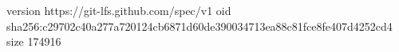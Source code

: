 version https://git-lfs.github.com/spec/v1
oid sha256:c29702c40a277a720124cb6871d60de390034713ea88c81fce8fe407d4252cd4
size 174916
